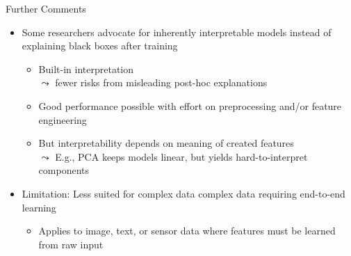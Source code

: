 \documentclass[10pt,compress,t,notes=noshow, xcolor=table]{beamer}
\begin{document}
\begin{frame}{Further Comments}

    \begin{itemize}
        \item<1-> Some researchers advocate for inherently interpretable models instead of explaining black boxes after training 
        \begin{itemize}
        \item Built-in interpretation\\
        $\leadsto$ fewer risks from misleading post-hoc explanations
        
        \item  Good performance possible with effort on preprocessing and/or feature engineering
        \item But interpretability depends on meaning of created features\\
        $\leadsto$ E.g., PCA keeps models linear, but yields hard-to-interpret components
        \end{itemize}
      \item<2-> Limitation: Less suited for complex data complex data requiring end-to-end learning
\begin{itemize}
    \item Applies to image, text, or sensor data where features must be learned from raw input

\end{itemize}
\end{itemize}
\end{frame}
\end{document}
